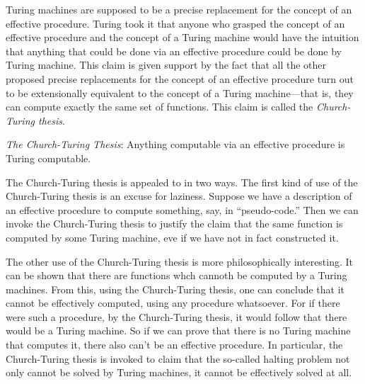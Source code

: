 \documentclass[../../../include/open-logic-section]{subfiles}
\begin{document}

Turing machines are supposed to be a precise replacement for the
concept of an effective procedure. Turing took it that anyone who
grasped the concept of an effective procedure and the concept of a
Turing machine would have the intuition that anything that could be
done via an effective procedure could be done by Turing machine. This
claim is given support by the fact that all the other proposed precise
replacements for the concept of an effective procedure turn out to be
extensionally equivalent to the concept of a Turing machine---that is,
they can compute exactly the same set of functions. This claim is
called the \emph{Church-Turing thesis}.

\begin{defn}
\emph{The Church-Turing Thesis}: Anything computable via an effective
procedure is Turing computable.
\end{defn}

The Church-Turing thesis is appealed to in two ways.  The first kind
of use of the Church-Turing thesis is an excuse for laziness.  Suppose
we have a description of an effective procedure to compute something,
say, in ``pseudo-code.''  Then we can invoke the Church-Turing thesis
to justify the claim that the same function is computed by some Turing
machine, eve if we have not in fact constructed it.

The other use of the Church-Turing thesis is more philosophically
interesting.  It can be shown that there are functions whch cannoth be
computed by a Turing machines.  From this, using the Church-Turing
thesis, one can conclude that it cannot be effectively computed, using
any procedure whatsoever.  For if there were such a procedure, by the
Church-Turing thesis, it would follow that there would be a Turing
machine.  So if we can prove that there is no Turing machine that
computes it, there also can't be an effective procedure.  In
particular, the Church-Turing thesis is invoked to claim that the
so-called halting problem not only cannot be solved by Turing
machines, it cannot be effectively solved at all.
\end{document}
